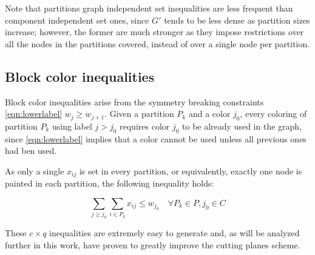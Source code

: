 Note that partitions graph independent set inequalities are less frequent than component independent set ones, since $G'$ tends to be less dense as partition sizes increase; however, the former are much stronger as they impose restrictions over all the nodes in the partitions covered, instead of over a single node per partition.

\subsection{Block color inequalities}

Block color inequalities arise from the symmetry breaking constraints \ref{eqn:lowerlabel} $w_j \geq w_{j+1}$. Given a partition $P_k$ and a color $j_0$, every coloring of partition $P_k$ using label $j > j_0$ requires color $j_0$ to be already used in the graph, since \ref{eqn:lowerlabel} implies that a color cannot be used unless all previous ones had ben used. 

As only a single $x_{ij}$ is set in every partition, or equivalently, exactly one node is painted in each partition, the following inequality holds:

\begin{equation}
\label{ineq:blockcp}
\sum_{j \geq j_0} \sum_{i \in P_k} x_{ij} \leq w_{j_0} \quad \forall P_k \in P, j_0 \in C
\end{equation}

These $c \times q$ inequalities are extremely easy to generate and, as will be analyzed further in this work, have proven to greatly improve the cutting planes scheme.
